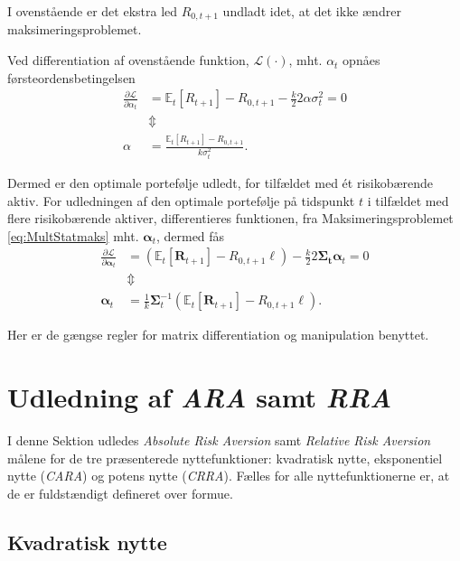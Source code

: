 \documentclass[
  a4paper,
  oneside]{memoir}
\begin{document}
I ovenstående er det ekstra led \(R_{0,t+1}\) undladt idet, at det ikke ændrer maksimeringsproblemet.

Ved differentiation af ovenstående funktion, \(\mathcal{L}(\cdot)\), mht. \(\alpha_t\) opnåes førsteordensbetingelsen
\begin{align*}
\frac{\partial \mathcal{L}}{\partial \alpha_t} &= \mathbb{E}_t\left[R_{t+1}\right] - R_{0,t+1} - \frac{k}{2}2\alpha\sigma_t^2=0\\
&\Updownarrow\\
\alpha&=\frac{\mathbb{E}_t\left[R_{t+1}\right]-R_{0,t+1}}{k\sigma_t^2}.
\end{align*}

Dermed er den optimale portefølje udledt, for tilfældet med ét risikobærende aktiv. For udledningen af den optimale portefølje på tidspunkt \(t\) i tilfældet med flere risikobærende aktiver, differentieres funktionen, fra Maksimeringsproblemet \eqref{eq:MultStatmaks} mht. \(\bm{\alpha}_t\), dermed fås
\begin{align*}
\frac{\partial \mathcal{L}}{\partial \bm{\alpha}_t} &= (\mathbb{E}_t\left[\bm{R}_{t+1}\right]- R_{0,t+1}\bm{\ell}) - \frac{k}{2}2\bm{\Sigma_t}\bm{\alpha}_t = 0\\
&\Updownarrow\\
\bm{\alpha}_t&=\frac{1}{k}\bm{\Sigma}_t^{-1}(\mathbb{E}_t\left[\bm{R}_{t+1}\right]-R_{0,t+1}\bm{\ell}).
\end{align*}

Her er de gængse regler for matrix differentiation og manipulation benyttet.

\hypertarget{udledning-af-ara-samt-rra}{%
\section{\texorpdfstring{Udledning af \emph{ARA} samt \emph{RRA}}{Udledning af ARA samt RRA}}\label{udledning-af-ara-samt-rra}}

I denne Sektion udledes \emph{Absolute Risk Aversion} samt \emph{Relative Risk Aversion} målene for de tre præsenterede nyttefunktioner: kvadratisk nytte, eksponentiel nytte (\emph{CARA}) og potens nytte (\emph{CRRA}). Fælles for alle nyttefunktionerne er, at de er fuldstændigt defineret over formue.

\hypertarget{kvadratisk-nytte-1}{%
\subsection{Kvadratisk nytte}\label{kvadratisk-nytte-1}}
\end{document}
